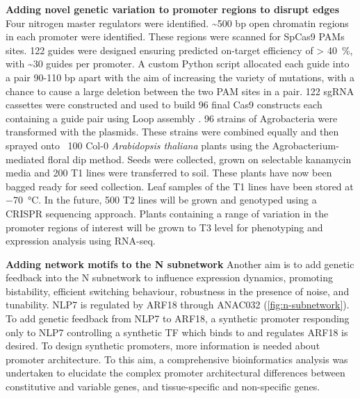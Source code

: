 \documentclass[../main.tex]{subfiles}
\begin{document}
\textbf{Adding novel genetic variation to promoter regions to disrupt edges}
Four nitrogen master regulators were identified. \textasciitilde{}500 bp open chromatin regions in each promoter were identified. These regions were scanned for SpCas9 PAMs sites. 122 guides were designed ensuring predicted on-target efficiency of \textgreater{} \SI{40}{\percent}, with \textasciitilde{}30 guides per promoter. A custom Python script allocated each guide into a pair 90-110 bp apart with the aim of increasing the variety of mutations, with a chance to cause a large deletion between the two PAM sites in a pair. 122 sgRNA cassettes were constructed and used to build 96 final Cas9 constructs each containing a guide pair using Loop assembly \autocite{pollakLoopAssemblySimple2018}. 96 strains of Agrobacteria were transformed with the plasmids. These strains were combined equally and then sprayed onto ~100 Col-0 \textit{Arabidopsis thaliana} plants using the Agrobacterium-mediated floral dip method. Seeds were collected, grown on selectable kanamycin media and 200 T1 lines were transferred to soil. These plants have now been bagged ready for seed collection. Leaf samples of the T1 lines have been stored at \SI{-70}{\degreeCelsius}. In the future, 500 T2 lines will be grown and genotyped using a CRISPR sequencing approach. Plants containing a range of variation in the promoter regions of interest will be grown to T3 level for phenotyping and expression analysis using RNA-seq.

\textbf{Adding network motifs to the N subnetwork}
Another aim is to add genetic feedback into the N subnetwork to influence expression dynamics, promoting bistability, efficient switching behaviour, robustness in the presence of noise, and tunability. NLP7 is regulated by ARF18 through ANAC032 (\autoref{fig:n-subnetwork}). To add genetic feedback from NLP7 to ARF18, a synthetic promoter responding only to NLP7 controlling a synthetic TF which binds to and regulates ARF18 is desired. To design synthetic promoters, more information is needed about promoter architecture. To this aim, a comprehensive bioinformatics analysis was undertaken to elucidate the complex promoter architectural differences between constitutive and variable genes, and tissue-specific and non-specific genes.
\end{document}
